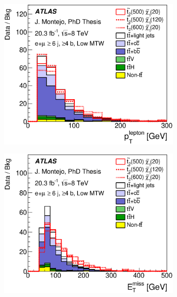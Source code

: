 \begin{figure}[!tp]
\centering
\begin{subfigure}{0.32\textwidth}
\includegraphics[trim=0cm 5cm 0cm 0cm, clip=true, width=\textwidth]{Analysis/Figures_stop2/plots_stop2_lowMTW/ELEMUON/6jetin/4btagin/lep_pt_ELEMUON_6jetin4btagin_NOMINAL}
\caption{}\end{subfigure}
\begin{subfigure}{0.32\textwidth}
\includegraphics[trim=0cm 5cm 0cm 0cm, clip=true, width=\textwidth]{Analysis/Figures_stop2/plots_stop2_lowMTW/ELEMUON/6jetin/4btagin/met_ELEMUON_6jetin4btagin_NOMINAL}

\end{subfigure}
\end{figure}
